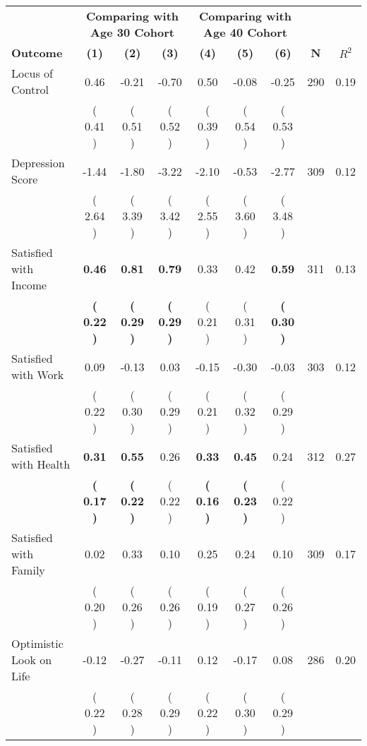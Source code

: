 \begin{tabular}{lcccccccc}
\toprule
 & \multicolumn{3}{c}{\textbf{Comparing with Age 30 Cohort}} & \multicolumn{3}{c}{\textbf{Comparing with Age 40 Cohort}} & \\
\cmidrule(lr){2-4} \cmidrule(lr){5-7} 
 \textbf{Outcome} & \textbf{(1)} & \textbf{(2)} & \textbf{(3)} & \textbf{(4)} & \textbf{(5)} & \textbf{(6)} & \textbf{N} & \textbf{$ R^2$} \\
\midrule
Locus of Control &      0.46 &     -0.21 &     -0.70 &      0.50 &     -0.08 &     -0.25 & 290 &       0.19 \\ 
 & (     0.41 ) & (     0.51 ) & (     0.52 ) & (     0.39 ) & (     0.54 ) & (     0.53 ) & \\
Depression Score &     -1.44 &     -1.80 &     -3.22 &     -2.10 &     -0.53 &     -2.77 & 309 &       0.12 \\ 
 & (     2.64 ) & (     3.39 ) & (     3.42 ) & (     2.55 ) & (     3.60 ) & (     3.48 ) & \\
Satisfied with Income & \textbf{     0.46} & \textbf{     0.81} & \textbf{     0.79} &      0.33 &      0.42 & \textbf{     0.59} & 311 &       0.13 \\ 
 & \textbf{(     0.22 )} & \textbf{(     0.29 )} & \textbf{(     0.29 )} & (     0.21 ) & (     0.31 ) & \textbf{(     0.30 )} & \\
Satisfied with Work &      0.09 &     -0.13 &      0.03 &     -0.15 &     -0.30 &     -0.03 & 303 &       0.12 \\ 
 & (     0.22 ) & (     0.30 ) & (     0.29 ) & (     0.21 ) & (     0.32 ) & (     0.29 ) & \\
Satisfied with Health & \textbf{     0.31} & \textbf{     0.55} &      0.26 & \textbf{     0.33} & \textbf{     0.45} &      0.24 & 312 &       0.27 \\ 
 & \textbf{(     0.17 )} & \textbf{(     0.22 )} & (     0.22 ) & \textbf{(     0.16 )} & \textbf{(     0.23 )} & (     0.22 ) & \\
Satisfied with Family &      0.02 &      0.33 &      0.10 &      0.25 &      0.24 &      0.10 & 309 &       0.17 \\ 
 & (     0.20 ) & (     0.26 ) & (     0.26 ) & (     0.19 ) & (     0.27 ) & (     0.26 ) & \\
Optimistic Look on Life &     -0.12 &     -0.27 &     -0.11 &      0.12 &     -0.17 &      0.08 & 286 &       0.20 \\ 
 & (     0.22 ) & (     0.28 ) & (     0.29 ) & (     0.22 ) & (     0.30 ) & (     0.29 ) & \\

\end{tabular}
